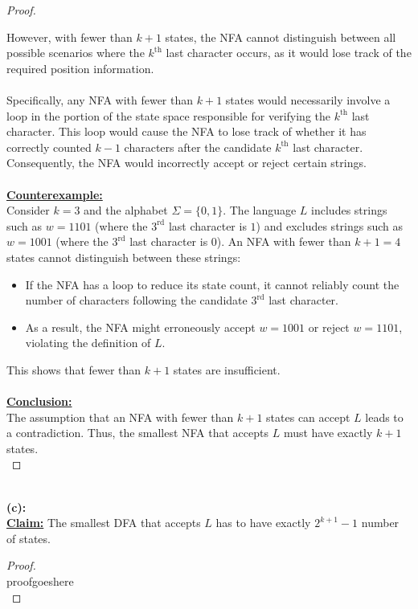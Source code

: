 \documentclass[12pt]{article}
\begin{document}
\begin{proof}
\begin{itemize}
    \end{itemize}
    However, with fewer than $k + 1$ states, the NFA cannot distinguish between all possible scenarios where the $k^\text{th}$ last character occurs, as it would lose track of the required position information. \\
    \\
    Specifically, any NFA with fewer than $k + 1$ states would necessarily involve a loop in the portion of the state space responsible for verifying the $k^\text{th}$ last character. This loop would cause the NFA to lose track of whether it has correctly counted $k - 1$ characters after the candidate $k^\text{th}$ last character. Consequently, the NFA would incorrectly accept or reject certain strings. \\
    \\
    \underline{\textbf{Counterexample:}} \\
    Consider $k = 3$ and the alphabet $\Sigma = \{0, 1\}$. The language $L$ includes strings such as $w = 1101$ (where the $3^\text{rd}$ last character is $1$) and excludes strings such as $w = 1001$ (where the $3^\text{rd}$ last character is $0$). An NFA with fewer than $k + 1 = 4$ states cannot distinguish between these strings:
    \begin{itemize}
        \item If the NFA has a loop to reduce its state count, it cannot reliably count the number of characters following the candidate $3^\text{rd}$ last character.
        \item As a result, the NFA might erroneously accept $w = 1001$ or reject $w = 1101$, violating the definition of $L$.
    \end{itemize}
    This shows that fewer than $k + 1$ states are insufficient. \\
    \\
    \underline{\textbf{Conclusion:}} \\
    The assumption that an NFA with fewer than $k + 1$ states can accept $L$ leads to a contradiction. Thus, the smallest NFA that accepts $L$ must have exactly $k + 1$ states. \\
\end{proof}
\leavevmode\\
\textbf{(c):} \\
\textbf{\underline{Claim:}} The smallest DFA that accepts $L$ has to have exactly $2^{k + 1} - 1$ number of states.
\begin{proof}
\leavevmode\\
    proofgoeshere \\
\end{proof}
\leavevmode\\
\pagebreak
\end{document}
